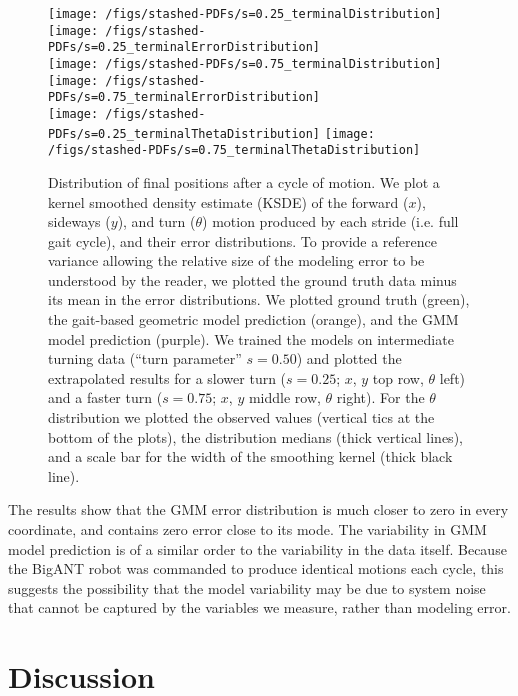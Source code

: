 \documentclass[conference]{IEEEtran}
\begin{document}
\begin{figure*}[h]
  \centering
  \texttt{[image: /figs/stashed-PDFs/s=0.25\_terminalDistribution]}
  \hspace{3mm}
  \texttt{[image: /figs/stashed-PDFs/s=0.25\_terminalErrorDistribution]} \\
  \texttt{[image: /figs/stashed-PDFs/s=0.75\_terminalDistribution]}
  \hspace{3mm}
  \texttt{[image: /figs/stashed-PDFs/s=0.75\_terminalErrorDistribution]}\\
  \texttt{[image: /figs/stashed-PDFs/s=0.25\_terminalThetaDistribution]}
  \hspace{3mm}
  \texttt{[image: /figs/stashed-PDFs/s=0.75\_terminalThetaDistribution]}
  \caption{Distribution of final positions after a cycle of motion. %
  	We plot a kernel smoothed density estimate (KSDE) of the forward ($x$), sideways ($y$), and turn ($\theta$) motion produced by each stride (i.e. full gait cycle), and their error distributions. %
  	To provide a reference variance allowing the relative size of the modeling error to be understood by the reader, we plotted the ground truth data minus its mean in the error distributions. %
  	We plotted ground truth (green), the  gait-based geometric model prediction (orange), and the GMM model prediction (purple). %
  	We trained the models on intermediate turning data (``turn parameter'' $s=0.50$) and plotted the extrapolated results for a slower turn ($s=0.25$; $x$, $y$ top row, $\theta$ left) and a faster turn ($s=0.75$; $x$, $y$ middle row, $\theta$ right). %
  	For the $\theta$ distribution we plotted the observed values (vertical tics at the bottom of the plots), the distribution medians (thick vertical lines), and a scale bar for the width of the smoothing kernel (thick black line).\label{figXpos2d}
  }
\end{figure*}

The results show that the GMM error distribution is much closer to zero in every coordinate, and contains zero error close to its mode.
The variability in GMM model prediction is of a similar order to the variability in the data itself.
Because the BigANT robot was commanded to produce identical motions each cycle, this suggests the possibility that the model variability may be due to system noise that cannot be captured by the variables we measure, rather than modeling error.
\section{Discussion}
\end{document}
